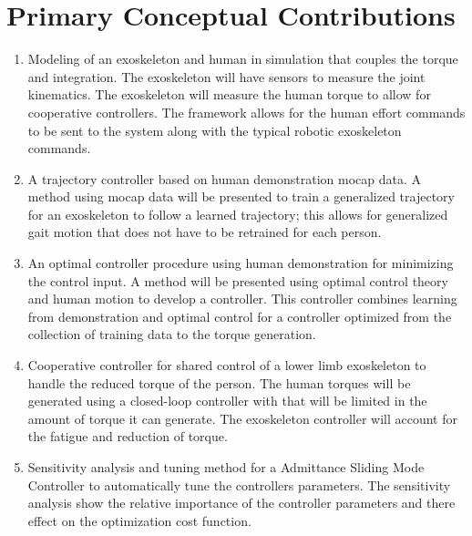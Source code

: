 \section{Primary Conceptual Contributions}
\begin{enumerate}[wide, nosep, labelindent = 0pt, topsep = 1ex]
    \item  Modeling of an exoskeleton and human in simulation that couples the torque and integration. The exoskeleton will have sensors to measure the joint kinematics. The exoskeleton will measure the human torque to allow for cooperative controllers. The framework allows for the human effort commands to be sent to the system along with the typical robotic exoskeleton commands. 
    \item A trajectory controller based on human demonstration mocap data. A method using mocap data will be presented to train a generalized trajectory for an exoskeleton to follow a learned trajectory; this allows for generalized gait motion that does not have to be retrained for each person. 
    \item An optimal controller procedure using human demonstration for minimizing the control input. A method will be presented using optimal control theory and human motion to develop a controller. This controller combines learning from demonstration and optimal control for a controller optimized from the collection of training data to the torque generation. 
    \item Cooperative controller for shared control of a lower limb exoskeleton to handle the reduced torque of the person. The human torques will be generated using a closed-loop controller with that will be limited in the amount of torque it can generate. The exoskeleton controller will account for the fatigue and reduction of torque. 
    \item Sensitivity analysis and tuning method for a Admittance Sliding Mode Controller to automatically tune the controllers parameters. The sensitivity analysis show the relative importance of the controller parameters and there effect on the optimization cost function.  
\end{enumerate}

